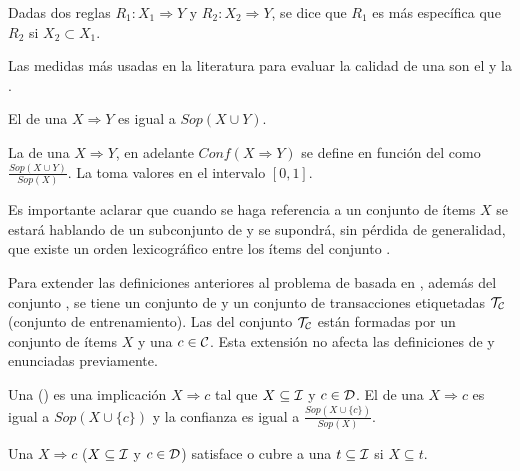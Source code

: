 \begin{Definition}[Especificidad]
  Dadas dos reglas $R_1: X_1\Rightarrow Y$ y $R_2: X_2\Rightarrow Y$, se dice que $R_1$ es más específica que $R_2$ si $X_2\subset X_1$.
\label{def:especificidad}
\end{Definition}

Las medidas más usadas en la literatura para evaluar la calidad de una \AR son el \soporte y la \confianza.

\begin{Definition}
  El \soporte de una \ar $X\Rightarrow Y$ es igual a $Sop(X\cup Y)$.
\label{def:soporte-de-una-AR}
\end{Definition}

\begin{Definition}
  La \confianza de una \ar $X\Rightarrow Y$, en adelante $Conf(X\Rightarrow Y)$ se define en función del \soporte como $\frac{Sop(X\cup Y)}{Sop(X)}$. La \confianza toma valores en el intervalo $[0,1]$.
\label{def:confianza-de-una-AR}
\end{Definition}

Es importante aclarar que cuando se haga referencia a un conjunto de ítems $X$ se estará hablando de un subconjunto de \I y se supondrá, sin pérdida de generalidad, que existe un orden lexicográfico entre los ítems del conjunto \I.

Para extender las definiciones anteriores al problema de \clasificacion basada en \sCARs, además del conjunto \I, se tiene un conjunto de \clases \C y un conjunto de transacciones etiquetadas $\T_\C$ (conjunto de entrenamiento). Las \transacciones del conjunto $\T_\C$ están formadas por un conjunto de ítems $X$ y una \clase $c\in \C$. Esta extensión no afecta las definiciones de \soporte y \confianza enunciadas previamente.

\begin{Definition}[\CAR]
  Una \CAR (\sCAR) es una implicación $X\Rightarrow c$ tal que $X\subseteq\I$ y $c\in\D$. El \soporte de una \CAR $X\Rightarrow c$ es igual a $Sop(X\cup\{c\})$ y la confianza es igual a $\frac{Sop(X\cup\{c\})}{Sop(X)}$.
\label{def:CAR}
\end{Definition}

\begin{Definition}
  Una \CAR $X\Rightarrow c$ ($X\subseteq\I$ y $c\in\D$) satisface o cubre a una \transaccion $t\subseteq\I$ si $X\subseteq t$.
\label{def:cubrimiento-CAR}
\end{Definition}

